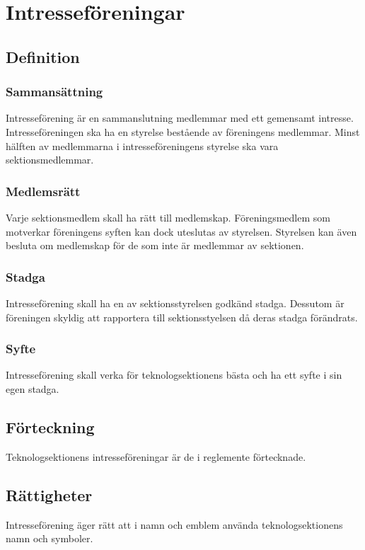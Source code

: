 \section{Intresseföreningar}

\subsection{Definition}

\subsubsection{Sammansättning}
Intresseförening är en sammanslutning medlemmar med ett gemensamt intresse. Intresseföreningen ska ha en styrelse bestående av föreningens medlemmar. Minst hälften av medlemmarna i intresseföreningens styrelse ska vara sektionsmedlemmar.

\subsubsection{Medlemsrätt}
Varje sektionsmedlem skall ha rätt till medlemskap. Föreningsmedlem som motverkar föreningens syften kan dock uteslutas av styrelsen. Styrelsen kan även besluta om medlemskap för de som inte är medlemmar av sektionen.

\subsubsection{Stadga}
Intresseförening skall ha en av sektionsstyrelsen godkänd stadga. Dessutom är föreningen skyldig att rapportera till sektionsstyelsen då deras stadga förändrats.

\subsubsection{Syfte}
Intresseförening skall verka för teknologsektionens bästa och ha ett syfte i sin egen stadga.

\subsection{Förteckning}
Teknologsektionens intresseföreningar är de i reglemente förtecknade.

\subsection{Rättigheter}
Intresseförening äger rätt att i namn och emblem använda teknologsektionens namn och symboler.

